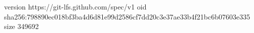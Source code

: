 version https://git-lfs.github.com/spec/v1
oid sha256:798890ec018bf3ba4d6d81e99d2586cf7dd20c3e37ae33b4f21bc6b07603e335
size 349692
